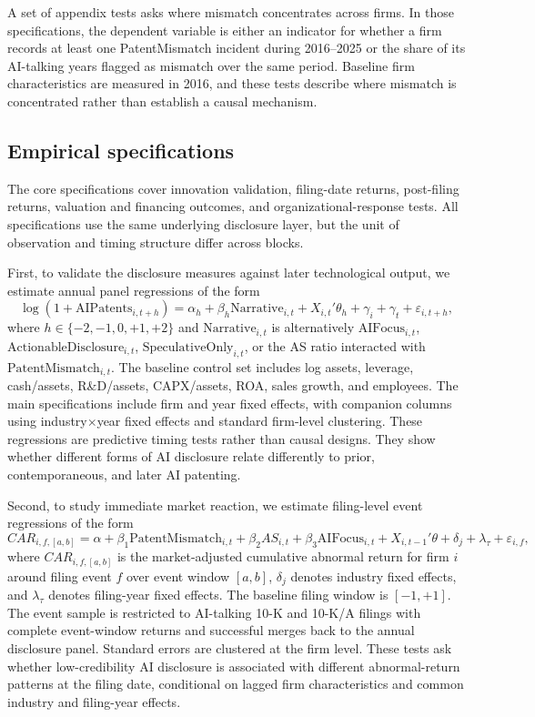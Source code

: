 A set of appendix tests asks where mismatch concentrates across firms. In those specifications, the dependent variable is either an indicator for whether a firm records at least one PatentMismatch incident during 2016--2025 or the share of its AI-talking years flagged as mismatch over the same period. Baseline firm characteristics are measured in 2016, and these tests describe where mismatch is concentrated rather than establish a causal mechanism.

\subsection{Empirical specifications}

The core specifications cover innovation validation, filing-date returns, post-filing returns, valuation and financing outcomes, and organizational-response tests. All specifications use the same underlying disclosure layer, but the unit of observation and timing structure differ across blocks.

First, to validate the disclosure measures against later technological output, we estimate annual panel regressions of the form
\[
\log(1+\mathrm{AIPatents}_{i,t+h})
=
\alpha_h + \beta_h \mathrm{Narrative}_{i,t} + X_{i,t}'\theta_h + \gamma_i + \gamma_t + \varepsilon_{i,t+h},
\]
where $h \in \{-2,-1,0,+1,+2\}$ and $\mathrm{Narrative}_{i,t}$ is alternatively $\mathrm{AIFocus}_{i,t}$, $\mathrm{ActionableDisclosure}_{i,t}$, $\mathrm{SpeculativeOnly}_{i,t}$, or the AS ratio interacted with $\mathrm{PatentMismatch}_{i,t}$. The baseline control set includes log assets, leverage, cash/assets, R\&D/assets, CAPX/assets, ROA, sales growth, and employees. The main specifications include firm and year fixed effects, with companion columns using industry$\times$year fixed effects and standard firm-level clustering. These regressions are predictive timing tests rather than causal designs. They show whether different forms of AI disclosure relate differently to prior, contemporaneous, and later AI patenting.

Second, to study immediate market reaction, we estimate filing-level event regressions of the form
\[
CAR_{i,f,[a,b]}
=
\alpha + \beta_1 \mathrm{PatentMismatch}_{i,t}
+ \beta_2 AS_{i,t}
+ \beta_3 \mathrm{AIFocus}_{i,t}
+ X_{i,t-1}'\theta + \delta_{j} + \lambda_{\tau} + \varepsilon_{i,f},
\]
where $CAR_{i,f,[a,b]}$ is the market-adjusted cumulative abnormal return for firm $i$ around filing event $f$ over event window $[a,b]$, $\delta_{j}$ denotes industry fixed effects, and $\lambda_{\tau}$ denotes filing-year fixed effects. The baseline filing window is $[-1,+1]$. The event sample is restricted to AI-talking 10-K and 10-K/A filings with complete event-window returns and successful merges back to the annual disclosure panel. Standard errors are clustered at the firm level. These tests ask whether low-credibility AI disclosure is associated with different abnormal-return patterns at the filing date, conditional on lagged firm characteristics and common industry and filing-year effects.

